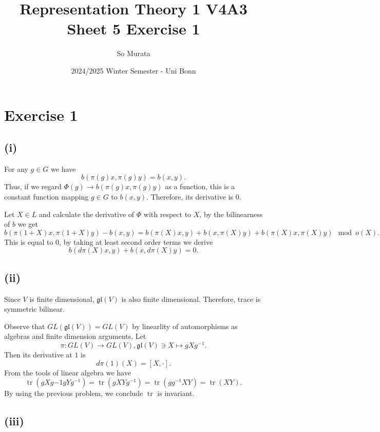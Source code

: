 \documentclass{article}
\title{Representation Theory 1 V4A3 Sheet 5 Exercise 1}
\author{So Murata}
\date{2024/2025 Winter Semester - Uni Bonn}
\numberwithin{equation}{section}
\DeclareMathOperator{\tr}{tr}
\begin{document}
\section*{Exercise 1}

\subsection*{(i)}
For any $g\in G$ we have
\begin{equation*}
b(\pi(g)x,\pi(g)y) = b(x,y).
\end{equation*}
Thus, if we regard $\Phi(g)\to b(\pi(g)x,\pi(g)y)$ as a function, this is a constant function mapping $g\in G$ to $b(x,y)$. Therefore, its derivative is $0$.\\
\par Let $X\in L$ and calculate the derivative of $\Phi$ with respect to $X$, by the bilinearness of $b$ we get
\begin{equation*}
b(\pi(1+X)x,\pi(1+X)y) - b(x,y) = b(\pi(X)x,y)+b(x,\pi(X)y)+b(\pi(X)x,\pi(X)y)\mod{o(X)}.
\end{equation*}
This is equal to $0$, by taking at least second order terms we derive
\begin{equation*}
b(d\pi(X)x,y)+b(x,d\pi(X)y)=0.
\end{equation*}

\subsection*{(ii)}

Since $V$ is finite dimensional, $\mathfrak{gl}(V)$ is also finite dimensional. Therefore, trace is symmetric bilinear.\\
\par Observe that $GL(\mathfrak{gl}(V)) = GL(V)$ by linearlity of automorphisms as algebras and finite dimension arguments. Let
\begin{equation*}
\pi:GL(V)\to GL(V), \mathfrak{gl}(V)\ni X\mapsto gXg^{-1}.
\end{equation*}
Then its derivative at $1$ is 
\begin{equation*}
d\pi(1)(X) = [X,\cdot].
\end{equation*}
From the tools of linear algebra we have
\begin{equation*}
\tr(gXg{-1}gYg^{-1}) = \tr(gXYg^{-1}) = \tr(gg^{-1}XY) = \tr(XY).
\end{equation*}
By using the previous problem, we conclude $\tr$ is invariant.
\subsection*{(iii)}
\end{document}
